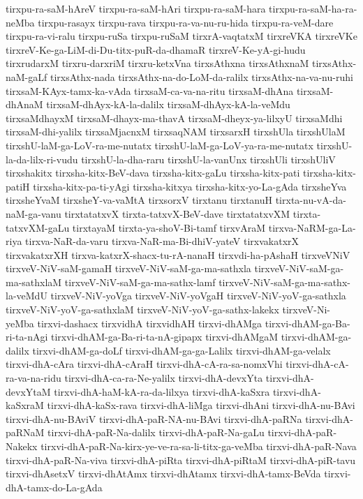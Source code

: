 {tirxpu-ra-saM-hAreV
tirxpu-ra-saM-hAri
tirxpu-ra-saM-hara
tirxpu-ra-saM-ha-ra-neMba
tirxpu-rasayx
tirxpu-rava
tirxpu-ra-va-nu-ru-hida
tirxpu-ra-veM-dare
tirxpu-ra-vi-ralu
tirxpu-ruSa
tirxpu-ruSaM
tirxrA-vaqtatxM
tirxreVKA
tirxreVKe
tirxreV-Ke-ga-LiM-di-Du-titx-puR-da-dhamaR
tirxreV-Ke-yA-gi-hudu
tirxrudarxM
tirxru-darxriM
tirxru-ketxVna
tirxsAthxna
tirxsAthxnaM
tirxsAthx-naM-gaLf
tirxsAthx-nada
tirxsAthx-na-do-LoM-da-ralilx
tirxsAthx-na-va-nu-ruhi
tirxsaM-KAyx-tamx-ka-vAda
tirxsaM-ca-va-na-ritu
tirxsaM-dhAna
tirxsaM-dhAnaM
tirxsaM-dhAyx-kA-la-dalilx
tirxsaM-dhAyx-kA-la-veMdu
tirxsaMdhayxM
tirxsaM-dhayx-ma-thavA
tirxsaM-dheyx-ya-lilxyU
tirxsaMdhi
tirxsaM-dhi-yalilx
tirxsaMjacnxM
tirxsaqNAM
tirxsarxH
tirxshUla
tirxshUlaM
tirxshU-laM-ga-LoV-ra-me-nutatx
tirxshU-laM-ga-LoV-ya-ra-me-nutatx
tirxshU-la-da-lilx-ri-vudu
tirxshU-la-dha-raru
tirxshU-la-vanUnx
tirxshUli
tirxshUliV
tirxshakitx
tirxsha-kitx-BeV-dava
tirxsha-kitx-gaLu
tirxsha-kitx-pati
tirxsha-kitx-patiH
tirxsha-kitx-pa-ti-yAgi
tirxsha-kitxya
tirxsha-kitx-yo-La-gAda
tirxsheYva
tirxsheYvaM
tirxsheY-va-vaMtA
tirxsorxV
tirxtanu
tirxtanuH
tirxta-nu-vA-da-naM-ga-vanu
tirxtatatxvX
tirxta-tatxvX-BeV-dave
tirxtatatxvXM
tirxta-tatxvXM-gaLu
tirxtayaM
tirxta-ya-shoV-Bi-tamf
tirxvAraM
tirxva-NaRM-ga-La-riya
tirxva-NaR-da-varu
tirxva-NaR-ma-Bi-dhiV-yateV
tirxvakatxrX
tirxvakatxrXH
tirxva-katxrX-shacx-tu-rA-nanaH
tirxvdi-ha-pAshaH
tirxveVNiV
tirxveV-NiV-saM-gamaH
tirxveV-NiV-saM-ga-ma-sathxla
tirxveV-NiV-saM-ga-ma-sathxlaM
tirxveV-NiV-saM-ga-ma-sathx-lamf
tirxveV-NiV-saM-ga-ma-sathx-la-veMdU
tirxveV-NiV-yoVga
tirxveV-NiV-yoVgaH
tirxveV-NiV-yoV-ga-sathxla
tirxveV-NiV-yoV-ga-sathxlaM
tirxveV-NiV-yoV-ga-sathx-lakekx
tirxveV-Ni-yeMba
tirxvi-dashacx
tirxvidhA
tirxvidhAH
tirxvi-dhAMga
tirxvi-dhAM-ga-Ba-ri-ta-nAgi
tirxvi-dhAM-ga-Ba-ri-ta-nA-gipapx
tirxvi-dhAMgaM
tirxvi-dhAM-ga-dalilx
tirxvi-dhAM-ga-doLf
tirxvi-dhAM-ga-ga-Lalilx
tirxvi-dhAM-ga-velalx
tirxvi-dhA-cAra
tirxvi-dhA-cAraH
tirxvi-dhA-cA-ra-sa-nomxVhi
tirxvi-dhA-cA-ra-va-na-ridu
tirxvi-dhA-ca-ra-Ne-yalilx
tirxvi-dhA-devxYta
tirxvi-dhA-devxYtaM
tirxvi-dhA-haM-kA-ra-da-lilxya
tirxvi-dhA-kaSxra
tirxvi-dhA-kaSxraM
tirxvi-dhA-kaSx-rava
tirxvi-dhA-liMga
tirxvi-dhAni
tirxvi-dhA-nu-BAvi
tirxvi-dhA-nu-BAviV
tirxvi-dhA-paR-NA-nu-BAvi
tirxvi-dhA-paRNa
tirxvi-dhA-paRNaM
tirxvi-dhA-paR-Na-dalilx
tirxvi-dhA-paR-Na-gaLu
tirxvi-dhA-paR-Nakekx
tirxvi-dhA-paR-Na-kirx-ye-ve-ra-sa-li-titx-ga-veMba
tirxvi-dhA-paR-Nava
tirxvi-dhA-paR-Na-viva
tirxvi-dhA-piRta
tirxvi-dhA-piRtaM
tirxvi-dhA-piR-tavu
tirxvi-dhAsetxV
tirxvi-dhAtAmx
tirxvi-dhAtamx
tirxvi-dhA-tamx-BeVda
tirxvi-dhA-tamx-do-La-gAda
}
